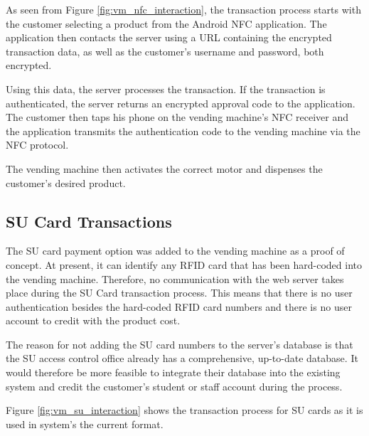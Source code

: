 As seen from Figure \ref{fig:vm_nfc_interaction}, the transaction process starts with the
customer selecting a product from the Android NFC application. The application
then contacts the server using a URL containing the encrypted transaction data,
as well as the customer's username and password, both encrypted.

Using this data, the server processes the transaction. If the transaction is
authenticated, the server returns an encrypted approval code to the application.
The customer then taps his phone on the vending machine's NFC receiver
and the application transmits the authentication code to the vending machine
via the NFC protocol.

The vending machine then activates the correct motor and dispenses the
customer's desired product.

\subsection{SU Card Transactions}
\label{sec:su-card}

The SU card payment option was added to the vending machine as a proof of
concept. At present, it can identify any RFID card that has been hard-coded
into the vending machine. Therefore, no communication with the web server takes
place during the SU Card transaction process. This means that there is no user
authentication besides the hard-coded RFID card numbers and there is no user
account to credit with the product cost.

The reason for not adding the SU card numbers to the server's database is that
the SU access control office already has a comprehensive, up-to-date database. It
would therefore be more feasible to integrate their database into the existing
system and credit the customer's student or staff account during the process. 

Figure \ref{fig:vm_su_interaction} shows the transaction process for SU cards as it is
used in system's the current format. 

